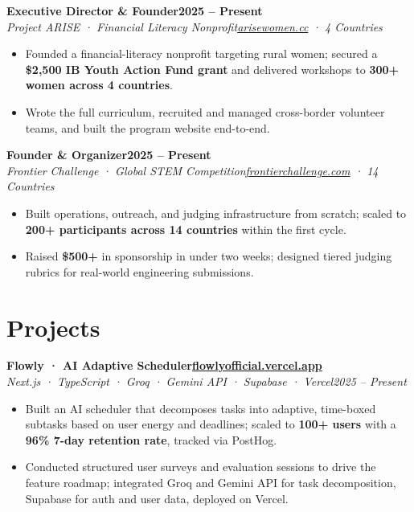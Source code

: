 \documentclass[10.4pt,letterpaper]{article}
\newcommand{\sub}[4]{%
  \vspace{2pt}%
  {\bfseries #1}\hfill{\bfseries\small #2}\\[-1pt]%
  \textit{\small #3}\hfill{\textit{\small #4}}%
  \vspace{1pt}%
}
\newenvironment{tlist}{%
  \begin{itemize}[leftmargin=1.3em, nosep, topsep=2pt, itemsep=0.5pt]%
  \small%
}{%
  \end{itemize}%
}
\begin{document}
\vspace{3pt}
\sub{Executive Director \& Founder}{2025 – Present}{Project ARISE · Financial Literacy Nonprofit}{\href{https://arisewomen.cc}{arisewomen.cc} · 4 Countries}
\begin{tlist}
  \item Founded a financial-literacy nonprofit targeting rural women; secured a \textbf{\$2,500 IB Youth Action Fund grant} and delivered workshops to \textbf{300+ women across 4 countries}.
  \item Wrote the full curriculum, recruited and managed cross-border volunteer teams, and built the program website end-to-end.
\end{tlist}

\vspace{3pt}
\sub{Founder \& Organizer}{2025 – Present}{Frontier Challenge · Global STEM Competition}{\href{https://frontierchallenge.com}{frontierchallenge.com} · 14 Countries}
\begin{tlist}
  \item Built operations, outreach, and judging infrastructure from scratch; scaled to \textbf{200+ participants across 14 countries} within the first cycle.
  \item Raised \textbf{\$500+} in sponsorship in under two weeks; designed tiered judging rubrics for real-world engineering submissions.
\end{tlist}

\section{Projects}

\sub{Flowly · AI Adaptive Scheduler}{\href{https://flowlyofficial.vercel.app/}{flowlyofficial.vercel.app}}{Next.js · TypeScript · Groq · Gemini API · Supabase · Vercel}{2025 – Present}
\begin{tlist}
  \item Built an AI scheduler that decomposes tasks into adaptive, time-boxed subtasks based on user energy and deadlines; scaled to \textbf{100+ users} with a \textbf{96\% 7-day retention rate}, tracked via PostHog.
  \item Conducted structured user surveys and evaluation sessions to drive the feature roadmap; integrated Groq and Gemini API for task decomposition, Supabase for auth and user data, deployed on Vercel.
\end{tlist}
\end{document}
